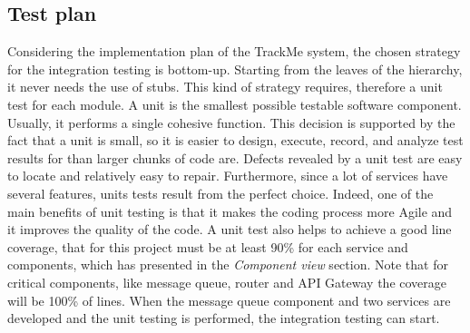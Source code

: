 \subsection{Test plan}
Considering the implementation plan of the TrackMe system, the chosen strategy for the integration testing is bottom-up. Starting from the leaves of the hierarchy, it never needs the use of stubs. This kind of strategy requires, therefore a unit test for each module. A unit is the smallest possible testable software component. Usually, it performs a single cohesive function. This decision is supported by the fact that a unit is small, so it is easier to design, execute, record, and analyze test results for than larger chunks of code are. Defects revealed by a unit test are easy to locate and relatively easy to repair. Furthermore, since a lot of services have several features, units tests result from the perfect choice. Indeed, one of the main benefits of unit testing is that it makes the coding process more Agile and it improves the quality of the code. A unit test also helps to achieve a good line coverage, that for this project must be at least 90\% for each service and components, which has presented in the \textit{Component view} section. Note that for critical components, like message queue, router and API Gateway the coverage will be 100\% of lines. When the message queue component and two services are developed and the unit testing is performed, the integration testing can start. 

